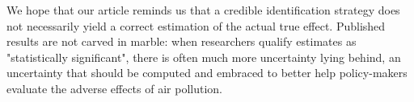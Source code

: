 \documentclass[12pt]{article}
\begin{document}
We hope that our article reminds us that a credible identification strategy does not necessarily yield a correct estimation of the actual true effect. Published results are not carved in marble: when researchers qualify estimates as "statistically significant", there is often much more uncertainty lying behind, an uncertainty that should be computed and embraced to better help policy-makers evaluate the adverse effects of air pollution.


\setlength\bibsep{0pt}


\end{document}
